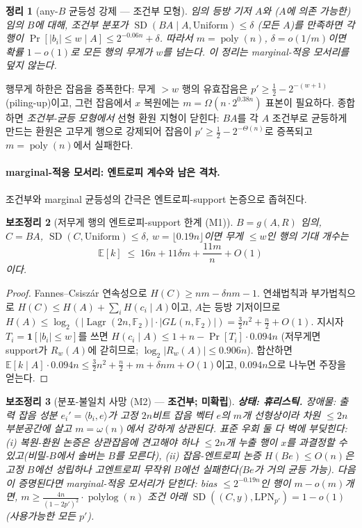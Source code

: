 \documentclass[11pt,a4paper]{article}
\theoremstyle{plain}
\newtheorem{theorem}{정리}[section]
\newtheorem{lemma}[theorem]{보조정리}
\theoremstyle{definition}
\newcommand{\F}{\mathbb{F}}
\newcommand{\E}{\mathbb{E}}
\DeclareMathOperator{\Lagr}{Lagr}
\begin{document}
\begin{theorem}[any-$B$ 균등성 강제 --- 조건부 모형]
임의 등방 기저 $A$와 ($A$에 의존 가능한) 임의 $B$에 대해, 조건부 분포가 $\operatorname{SD}(BA\mid A, \mathrm{Uniform}) \le \delta$ (모든 $A$)를 만족하면 각 행이 $\Pr[|b_i| \le w \mid A] \le 2^{-0.06n} + \delta$. 따라서 $m = \operatorname{poly}(n)$, $\delta = o(1/m)$이면 확률 $1-o(1)$로 \emph{모든} 행의 무게가 $w$를 넘는다. 이 정리는 marginal-적응 모서리를 덮지 \emph{않는다}.
\end{theorem}

행무게 하한은 잡음을 증폭한다: 무게 $>w$ 행의 유효잡음은 $p' \ge \tfrac12 - 2^{-(w+1)}$ (piling-up)이고, 그런 잡음에서 $x$ 복원에는 $m = \Omega(n\cdot 2^{0.38n})$ 표본이 필요하다. 종합하면 \emph{조건부-균등 모형에서} 선형 환원 지형이 닫힌다: $BA$를 각 $A$ 조건부로 균등하게 만드는 환원은 고무게 행으로 강제되어 잡음이 $p' \ge \tfrac12 - 2^{-\Theta(n)}$로 증폭되고 $m = \operatorname{poly}(n)$에서 실패한다.

\paragraph{marginal-적응 모서리: 엔트로피 계수와 남은 격차.} 조건부와 marginal 균등성의 간극은 엔트로피-support 논증으로 좁혀진다.

\begin{lemma}[저무게 행의 엔트로피-support 한계 (M1)]
$B = g(A,R)$ 임의, $C = BA$, $\operatorname{SD}(C, \mathrm{Uniform}) \le \delta$, $w = \lfloor 0.19n\rfloor$이면 무게 $\le w$인 행의 기대 개수는
\[
\E[k] \;\le\; 16n + 11\delta m + \frac{11m}{n} + O(1)
\]
이다.
\end{lemma}

\begin{proof}
Fannes--Csisz\'ar 연속성으로 $H(C) \ge nm - \delta nm - 1$. 연쇄법칙과 부가법칙으로 $H(C) \le H(A) + \sum_i H(c_i \mid A)$이고, $A$는 등방 기저이므로 $H(A) \le \log_2(|\Lagr(2n,\F_2)|\cdot|GL(n,\F_2)|) = \tfrac{3}{2}n^2 + \tfrac{n}{2} + O(1)$. 지시자 $T_i = \mathbf{1}[|b_i| \le w]$를 쓰면 $H(c_i\mid A) \le 1 + n - \Pr[T_i]\cdot 0.094n$ (저무게면 support가 $R_w(A)$에 갇히므로; $\log_2|R_w(A)| \le 0.906n$). 합산하면 $\E[k\mid A]\cdot 0.094n \le \tfrac{3}{2}n^2 + \tfrac{n}{2} + m + \delta nm + O(1)$이고, $0.094n$으로 나누면 주장을 얻는다.
\end{proof}

\begin{lemma}[분포-불일치 사망 (M2) --- \textbf{조건부; 미확립}]
\textbf{상태: 휴리스틱.} 장애물: 출력 잡음 성분 $e_i' = \langle b_i, e\rangle$가 고정 $2n$비트 잡음 벡터 $e$의 $m$개 선형상이라 차원 $\le 2n$ 부분공간에 살고 $m = \omega(n)$에서 강하게 상관된다. 표준 우회 둘 다 벽에 부딪힌다: (i) 복원-환원 논증은 상관잡음에 견고해야 하나 $\le 2n$개 누출 행이 $x$를 과결정할 수 있고(비밀-$B$에서 솔버는 $B$를 모른다), (ii) 잡음-엔트로피 논증 $H(Be) \le O(n)$은 고정 $B$에선 성립하나 고엔트로피 무작위 $B$에선 실패한다($Be$가 거의 균등 가능). 다음이 증명된다면 marginal-적응 모서리가 닫힌다: bias $\le 2^{-0.19n}$인 행이 $m - o(m)$개면, $m\ge \frac{4n}{(1-2p')^{2}}\cdot\operatorname{polylog}(n)$ 조건 아래 $\operatorname{SD}((C,y), \mathrm{LPN}_{p'}) = 1 - o(1)$ (사용가능한 모든 $p'$).
\end{lemma}
\end{document}
